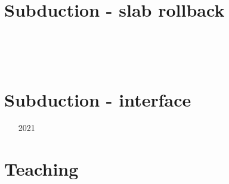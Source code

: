 \section{Subduction - slab rollback} 

\begin{small}
\begin{itemize}
\item[\twothousandthree] 
\item[\twothousandsix] 
\item[\twothousandnine] 
\item[\twothousandnine] 
\item[\twothousandtwelve] 
\item[\twothousandthirteen] 
 \\
\item[\twothousandfourteen]
 \\
\item[\twothousandfifteen]
\item[\twothousandtwenty]
\end{itemize}
\end{small}


\section{Subduction - interface} 

\begin{small}
\begin{itemize}
\item[2021]
\end{itemize}
\end{small}


\section{Teaching} 

\begin{small}
\begin{itemize}
\item[\twothousandeleven]
\item[\twothousandfourteen]
\item[\twothousandnineteen] 
\item[\twothousandtwentyone] 
\end{itemize}
\end{small}

